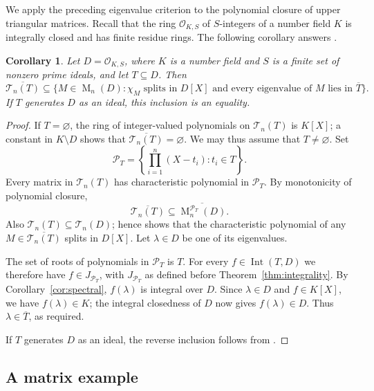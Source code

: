 \documentclass[11pt]{amsart}
\newtheorem{corollary}[theorem]{Corollary}
\theoremstyle{definition}
\theoremstyle{remark}
\newcommand{\Int}{\operatorname{Int}}
\newcommand{\Mat}{\operatorname{M}}
\begin{document}
We apply the preceding eigenvalue criterion to the polynomial closure
of upper triangular matrices. Recall that the ring $\mathcal O_{K,S}$
of $S$-integers of a number field $K$ is integrally closed and has
finite residue rings. The following corollary answers
\cite[Open Question~XV.55]{Chabert2025}.
\begin{corollary}\label{cor:xv55}
Let $D=\mathcal O_{K,S}$, where $K$ is a number field and $S$ is a
finite set of nonzero prime ideals, and let $T\subseteq D$. Then
\[
 \overline{\mathcal T_n(T)}\subseteq
 \{M\in\Mat_n(D):\chi_M\text{ splits in }D[X]
 \text{ and every eigenvalue of }M\text{ lies in }\overline T\}.
\]
If $T$ generates $D$ as an ideal, this inclusion is an equality.
\end{corollary}
\begin{proof}
If $T=\varnothing$, the ring of integer-valued polynomials on
$\mathcal T_n(T)$ is $K[X]$; a constant in $K\setminus D$ shows that
$\overline{\mathcal T_n(T)}=\varnothing$. We may thus assume that
$T\ne\varnothing$. Set
\[
 \mathcal P_T=\left\{\prod_{i=1}^n(X-t_i):t_i\in T\right\}.
\]
Every matrix in $\mathcal T_n(T)$ has characteristic polynomial in
$\mathcal P_T$. By monotonicity of polynomial closure,
\[
 \overline{\mathcal T_n(T)}\subseteq
 \overline{\Mat_n^{\mathcal P_T}(D)}.
\]
Also $\mathcal T_n(T)\subseteq\mathcal T_n(D)$; hence
\cite[Theorem~XV.54]{Chabert2025} shows that the characteristic
polynomial of any $M\in\overline{\mathcal T_n(T)}$ splits in $D[X]$.
Let $\lambda\in D$ be one of its eigenvalues.

The set of roots of polynomials in $\mathcal P_T$ is $T$.
For every $f\in\Int(T,D)$ we therefore have
$f\in J_{\mathcal P_T}$, with $J_{\mathcal P_T}$ as defined before
Theorem~\ref{thm:integrality}. By Corollary~\ref{cor:spectral},
$f(\lambda)$ is integral over $D$. Since $\lambda\in D$ and
$f\in K[X]$, we have $f(\lambda)\in K$; the integral closedness
of $D$ now gives $f(\lambda)\in D$.
Thus $\lambda\in\overline T$, as required.

If $T$ generates $D$ as an ideal, the reverse inclusion follows
from \cite[Lemma~XV.48]{Chabert2025}.
\end{proof}

\subsection{A matrix example}
\end{document}
